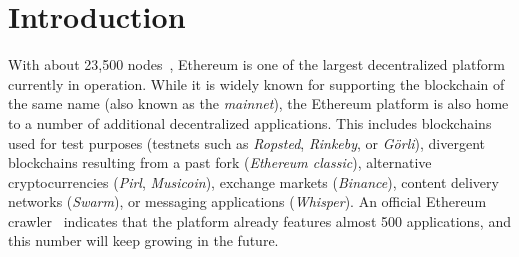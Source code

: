 
\section{Introduction}


With about 23,500 nodes~\cite{discv4-dns-lists},  Ethereum is one of the largest decentralized platform currently in operation.
While it is widely known for supporting the blockchain of the same name (also known as the \emph{mainnet}), the Ethereum platform is also home to a number of additional decentralized applications.
This includes blockchains used for test purposes (testnets such as \emph{Ropsted}, \emph{Rinkeby}, or \emph{G\"orli}), divergent blockchains resulting from a past fork (\emph{Ethereum classic}), alternative cryptocurrencies (\emph{Pirl}, \emph{Musicoin}), exchange markets (\emph{Binance}), content delivery networks (\emph{Swarm}), or messaging applications (\emph{Whisper}).
An official Ethereum crawler~\cite{discv4-dns-lists} indicates that the platform already features almost 500 applications, and this number will keep growing in the future.

